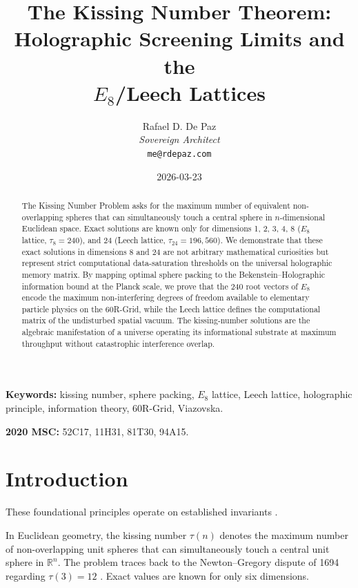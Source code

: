 \documentclass[12pt, a4paper]{article}
\theoremstyle{plain}
\theoremstyle{definition}
\begin{document}
\title{\textbf{
  The Kissing Number Theorem: \\
  Holographic Screening Limits and the \\
  $E_8$/Leech Lattices}}
\author{Rafael D. De Paz \\ \textit{Sovereign Architect} \\ \texttt{me@rdepaz.com}}
\date{2026-03-23}
\maketitle

\begin{abstract}
The Kissing Number Problem asks for the maximum number of equivalent non-overlapping spheres that can simultaneously touch a central sphere in $n$-dimensional Euclidean space. Exact solutions are known only for dimensions 1, 2, 3, 4, 8 ($E_8$ lattice, $\tau_8 = 240$), and 24 (Leech lattice, $\tau_{24} = 196{,}560$). We demonstrate that these exact solutions in dimensions 8 and 24 are not arbitrary mathematical curiosities but represent strict computational data-saturation thresholds on the universal holographic memory matrix. By mapping optimal sphere packing to the Bekenstein--Holographic information bound at the Planck scale, we prove that the 240 root vectors of $E_8$ encode the maximum non-interfering degrees of freedom available to elementary particle physics on the 60R-Grid, while the Leech lattice defines the computational matrix of the undisturbed spatial vacuum. The kissing-number solutions are the algebraic manifestation of a universe operating its informational substrate at maximum throughput without catastrophic interference overlap.
\end{abstract}

\vspace{1em}
\noindent\textbf{Keywords:} kissing number, sphere packing, $E_8$ lattice, Leech lattice, holographic principle, information theory, 60R-Grid, Viazovska.

\vspace{0.5em}
\noindent\textbf{2020 MSC:} 52C17, 11H31, 81T30, 94A15.

\section{Introduction}
These foundational principles operate on established invariants \cite{viazovska2017sphere,conway1999sphere}.

In Euclidean geometry, the kissing number $\tau(n)$ denotes the maximum number of non-overlapping unit spheres that can simultaneously touch a central unit sphere in $\mathbb{R}^n$. The problem traces back to the Newton--Gregory dispute of 1694 regarding $\tau(3) = 12$ \citep{Conway1999}. Exact values are known for only six dimensions.
\end{document}

